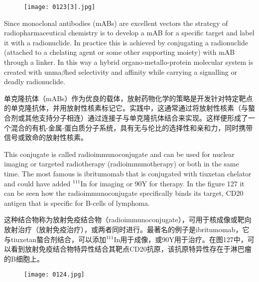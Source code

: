 \documentclass[dvipsnames, svgnames,a4paper,11pt]{article}
\begin{document}
\begin{figure}[h]
	\centering
    \texttt{[image: 0123[3].jpg]}    
     \label{fig126}
\end{figure}

Since monoclonal antibodies (mABs) are excellent vectors the strategy of
radiopharmaceutical chemistry is to develop a mAB for a specific target and label it
with a radionuclide. In practice this is achieved by conjugating a radionuclide
(attached to a chelating agent or some other supporting moiety) with mAB through a
linker. In this way a hybrid organo-metallo-protein molecular system is created with
unma$\beta$hed selectivity and affinity while carrying a signalling or deadly radionuclide.

单克隆抗体（mABs）作为优良的载体，放射药物化学的策略是开发针对特定靶点的单克隆抗体，并用放射性核素标记它。实践中，这通常通过将放射性核素（与螯合剂或其他支持分子相连）通过连接子与单克隆抗体结合来实现。这样便形成了一个混合的有机-金属-蛋白质分子系统，具有无与伦比的选择性和亲和力，同时携带信号或致命的放射性核素。



This conjugate is called radioimmunoconjugate and can be used for nuclear imaging
or targeted radiotherapy (radioimmunotherapy) or both in the same time. The most
famous is ibritumomab that is conjugated with tiuxetan chelator and could have
added ${}^{111}\mathrm{In}$ for imaging or 90Y for therapy. In the figure 127 it can be seen how the
radioimmunoconjugate specifically binds its target, CD20 antigen that is specific for
B-cells of lymphoma.

这种结合物称为放射免疫结合物（radioimmunoconjugate），可用于核成像或靶向放射治疗（放射免疫治疗），或两者同时进行。最著名的例子是ibritumomab，它与tiuxetan螯合剂结合，可以添加${}^{111}\mathrm{In}$用于成像，或90Y用于治疗。在图127中，可以看到放射免疫结合物特异性结合其靶点CD20抗原，该抗原特异性存在于淋巴瘤的B细胞上。

\begin{figure}[h]
	\centering
    \texttt{[image: 0124.jpg]}    
     \label{fig127}
\end{figure}
\end{document}
